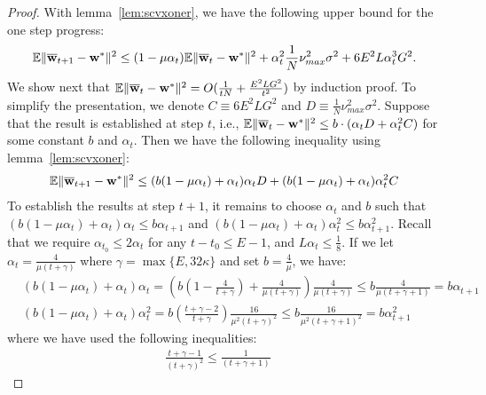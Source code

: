 \begin{proof}
	With lemma~\ref{lem:scvxoner}, we have the following upper bound for the one step progress: 
	\begin{align*}
	\mathbb{E}\|{\overline{\mathbf{w}}}_{t+1}-{\mathbf{w}}^{\ast}\|^{2} & \leq(1-\mu\alpha_{t})\mathbb{E}\|{\overline{\mathbf{w}}}_{t}-{\mathbf{w}}^{\ast}\|^{2}+\alpha_{t}^{2}\frac{1}{N}\nu_{max}^{2}\sigma^{2}+6E^{2}L\alpha_{t}^{3}G^{2}.
	\end{align*}
	We show next that $\mathbb{E}\|{\overline{\mathbf{w}}}_{t}-{\mathbf{w}}^{\ast}\|^{2}=O(\frac{1}{tN}+\frac{E^{2}LG^{2}}{t^{2}})$ by induction proof. 
	To simplify the presentation, we denote $C\equiv6E^{2}LG^{2}$ and $D\equiv\frac{1}{N}\nu_{max}^{2}\sigma^{2}$.
	Suppose that the result is established at step $t$, i.e., $\mathbb{E}\|{\overline{\mathbf{w}}}_{t}-{\mathbf{w}}^{\ast}\|^{2}\leq b\cdot(\alpha_{t}D+\alpha_{t}^{2}C)$
	for some constant $b$ and $\alpha_{t}$. Then we have the following inequality using lemma~\ref{lem:scvxoner}:
	\begin{align*}
	\mathbb{E}\|{\overline{\mathbf{w}}}_{t+1}-{\mathbf{w}}^{\ast}\|^{2} & \leq (b(1-\mu\alpha_{t})+\alpha_{t})\alpha_{t}D+(b(1-\mu\alpha_{t})+\alpha_{t})\alpha_{t}^{2}C
	\end{align*}
	To establish the results at step $t+1$, it remains to choose $\alpha_{t}$ and $b$ such that $(b(1-\mu\alpha_{t})+\alpha_{t})\alpha_{t}\leq b\alpha_{t+1}$
	and $(b(1-\mu\alpha_{t})+\alpha_{t})\alpha_{t}^{2}\leq b\alpha_{t+1}^{2}$.
	Recall that we require $\alpha_{t_{0}}\leq2\alpha_{t}$ for any $t-t_{0}\leq E-1$,
	and $L\alpha_{t}\leq\frac{1}{8}$. If we let $\alpha_{t}=\frac{4}{\mu(t+\gamma)}$
	where $\gamma=\max\{E,32\kappa\}$ and set $b=\frac{4}{\mu}$, we have:
	\begin{align*}
	& (b(1-\mu\alpha_{t})+\alpha_{t})\alpha_{t}  =\left(b(1-\frac{4}{t+\gamma})+\frac{4}{\mu(t+\gamma)}\right)\frac{4}{\mu(t+\gamma)}
	 \leq b\frac{4}{\mu(t+\gamma+1)}=b\alpha_{t+1}\\
	& (b(1-\mu\alpha_{t})+\alpha_{t})\alpha_{t}^{2} 
	 =b(\frac{t+\gamma-2}{t+\gamma})\frac{16}{\mu^{2}(t+\gamma)^{2}} \leq b\frac{16}{\mu^{2}(t+\gamma+1)^{2}}=b\alpha_{t+1}^{2}
	\end{align*}
	where we have used the following inequalities:
	\begin{align*}
	\frac{t+\gamma-1}{(t+\gamma)^{2}} \leq\frac{1}{(t+\gamma+1)}   \hspace{2em}

\end{align*}
\end{proof}

